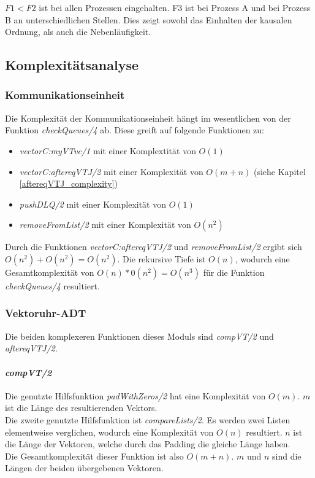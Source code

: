$F1 < F2$ ist bei allen Prozessen eingehalten. F3 ist bei Prozess A und bei Prozess B an unterschiedlichen Stellen. Dies zeigt sowohl das Einhalten der kausalen Ordnung, als auch die Nebenläufigkeit.

\subsection{Komplexitätsanalyse}

\subsubsection{Kommunikationseinheit}

Die Komplexität der Kommunikationseinheit hängt im wesentlichen von der Funktion \textit{checkQueues/4} ab. Diese greift auf folgende Funktionen zu:
\begin{itemize}
    \item \textit{vectorC:myVTvc/1} mit einer Komplextität von $O(1)$
    \item \textit{vectorC:aftereqVTJ/2} mit einer Komplexität von $O(m+n)$ (siehe Kapitel \ref{aftereqVTJ_complexity})
    \item \textit{pushDLQ/2} mit einer Komplexität von $O(1)$
    \item \textit{removeFromList/2} mit einer Komplexität von $O(n^2)$
\end{itemize}

Durch die Funktionen \textit{vectorC:aftereqVTJ/2} und \textit{removeFromList/2} ergibt sich $O(n^2)+O(n^2)=O(n^2)$. Die rekursive Tiefe ist $O(n)$, wodurch eine Gesamtkomplexität von $O(n)*0(n^2)=O(n^3)$ für die Funktion \textit{checkQueues/4} resultiert.

\subsubsection{Vektoruhr-ADT}

Die beiden komplexeren Funktionen dieses Moduls sind \textit{compVT/2} und \textit{aftereqVTJ/2}. 

\paragraph{\textit{compVT/2}}

Die genutzte Hilfsfunktion \textit{padWithZeros/2} hat eine Komplexität von $O(m)$. $m$ ist die Länge des resultierenden Vektors.\\
Die zweite genutzte Hilfsfunktion ist \textit{compareLists/2}. Es werden zwei Listen elementweise verglichen, wodurch eine Komplexität von $O(n)$ resultiert. $n$ ist die Länge der Vektoren, welche durch das Padding die gleiche Länge haben.\\
Die Gesamtkomplexität dieser Funktion ist also $O(m+n)$. $m$ und $n$ sind die Längen der beiden übergebenen Vektoren.

